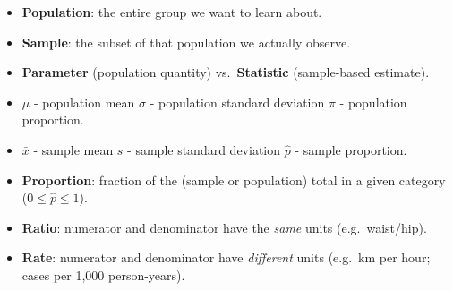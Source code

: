 \documentclass[12pt]{book}
\begin{document}


\begin{center}
	\ccbyncsa
\end{center}



\newpage
\thispagestyle{empty}
\mbox{}
\newpage

\setcounter{page}{1}

\pagestyle{fancy}

\begin{itemize}
  \item \textbf{Population}: the entire group we want to learn about.
  \item \textbf{Sample}: the subset of that population we actually observe.
  \item \textbf{Parameter} (population quantity) vs.\ \textbf{Statistic} (sample-based estimate).

  \item $\mu$ - population mean \newline \quad\; $\sigma$ - population standard deviation \newline \quad\;
        $\pi$ - population proportion.
  \item $\bar{x}$ - sample mean \newline \quad\; $s$ - sample standard deviation \newline \quad\;
        $\hat{p}$ - sample proportion.

  \item \textbf{Proportion}: fraction of the (sample or population) total in a given category
        ($0 \le \hat{p} \le 1$).
  \item \textbf{Ratio}: numerator and denominator have the \emph{same} units (e.g.\ waist/hip).
  \item \textbf{Rate}: numerator and denominator have \emph{different} units
        (e.g.\ km per hour; cases per 1,000 person-years).


\end{itemize}
\end{document}
